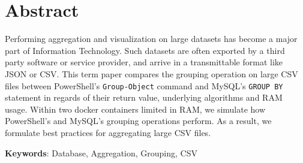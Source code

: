 \section*{Abstract}
Performing aggregation and visualization on large datasets has become a major part of Information Technology.
Such datasets are often exported by a third party software or service provider, and arrive in a transmittable
format like JSON or CSV.
This term paper compares the grouping operation on large CSV files between PowerShell's
\verb+Group-Object+ command and MySQL's \verb+GROUP BY+ statement in regards of
their return value, underlying algorithms and RAM usage. Within two docker containers
limited in RAM, we simulate how PowerShell's and MySQL's grouping operations perform. As a result,
we formulate best practices for aggregating large CSV files.

\textbf{Keywords}: Database, Aggregation, Grouping, CSV